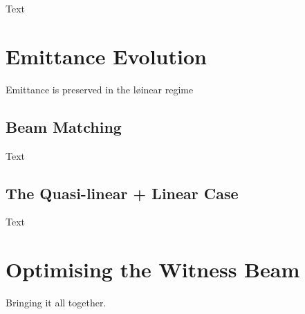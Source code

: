 Text

\section{Emittance Evolution}
\label{Sim:Emitt}

Emittance is preserved in the løinear regime

\subsection{Beam Matching}
\label{Sim:Match}

Text

\subsection{The Quasi-linear + Linear Case}
\label{Sim:QLinLin}

Text

\section{Optimising the Witness Beam}
\label{Sim:Opt}

Bringing it all together.

